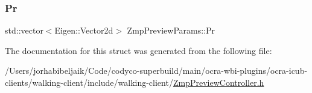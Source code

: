 \subsubsection{\texorpdfstring{Pr}{Pr}}
{\footnotesize\ttfamily std\+::vector$<$Eigen\+::\+Vector2d$>$ Zmp\+Preview\+Params\+::\+Pr}



The documentation for this struct was generated from the following file\+:\begin{DoxyCompactItemize}
\item 
/\+Users/jorhabibeljaik/\+Code/codyco-\/superbuild/main/ocra-\/wbi-\/plugins/ocra-\/icub-\/clients/walking-\/client/include/walking-\/client/\hyperlink{ZmpPreviewController_8h}{Zmp\+Preview\+Controller.\+h}\end{DoxyCompactItemize}
